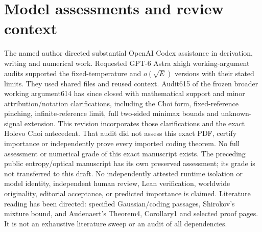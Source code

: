 \documentclass[11pt]{article}
\begin{document}
\section*{Model assessments and review context}
The named author directed substantial OpenAI Codex assistance in
derivation, writing and numerical work.
Requested GPT-6 Astra xhigh working-argument audits supported the
fixed-temperature and \(o(\sqrt E)\) versions with their stated limits.
They used shared files and reused context.
Audit615 of the frozen broader working argument614 has since closed
with mathematical support and minor attribution/notation clarifications,
including the Choi form, fixed-reference pinching, infinite-reference
limit, full two-sided minimax bounds and unknown-signal extension.
This revision incorporates those clarifications and the exact Holevo
Choi antecedent. That audit did not assess this exact PDF, certify
importance or independently prove every imported coding theorem.
No full assessment or numerical grade of this exact manuscript exists.
The preceding public entropy/optical manuscript has its own preserved
assessment; its grade is not transferred to this draft.
No independently attested runtime isolation or model identity,
independent human review, Lean verification, worldwide originality,
editorial acceptance, or predicted importance is claimed.
Literature reading has been directed: specified Gaussian/coding
passages, Shirokov's mixture bound, and Audenaert's Theorem4, Corollary1
and selected proof pages. It is not an exhaustive literature sweep
or an audit of all dependencies.
\end{document}
